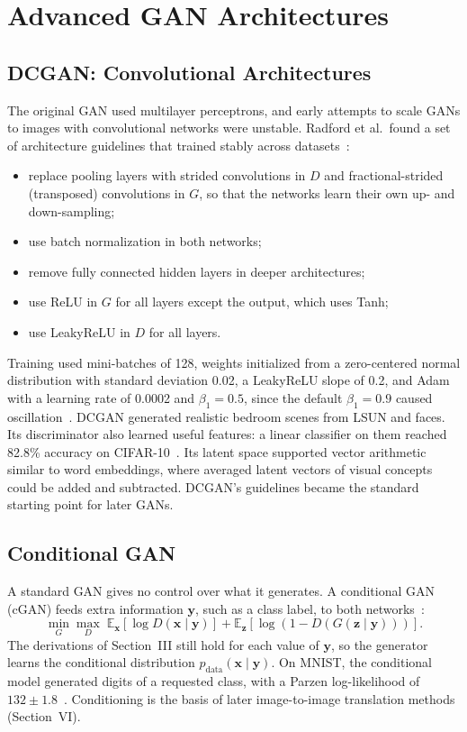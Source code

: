 \documentclass[conference]{IEEEtran}
\newcommand{\E}{\mathbb{E}}
\newcommand{\pdata}{p_{\mathrm{data}}}
\begin{document}
\section{Advanced GAN Architectures}
\subsection{DCGAN: Convolutional Architectures}
The original GAN used multilayer perceptrons, and early attempts to scale GANs to images with convolutional networks were unstable. Radford et al.\ found a set of architecture guidelines that trained stably across datasets~\cite{radford2016}:
\begin{itemize}
\item replace pooling layers with strided convolutions in $D$ and fractional-strided (transposed) convolutions in $G$, so that the networks learn their own up- and down-sampling;
\item use batch normalization in both networks;
\item remove fully connected hidden layers in deeper architectures;
\item use ReLU in $G$ for all layers except the output, which uses Tanh;
\item use LeakyReLU in $D$ for all layers.
\end{itemize}
Training used mini-batches of 128, weights initialized from a zero-centered normal distribution with standard deviation 0.02, a LeakyReLU slope of 0.2, and Adam with a learning rate of 0.0002 and $\beta_1=0.5$, since the default $\beta_1=0.9$ caused oscillation~\cite{radford2016}. DCGAN generated realistic bedroom scenes from LSUN and faces. Its discriminator also learned useful features: a linear classifier on them reached 82.8\% accuracy on CIFAR-10~\cite{radford2016}. Its latent space supported vector arithmetic similar to word embeddings, where averaged latent vectors of visual concepts could be added and subtracted. DCGAN's guidelines became the standard starting point for later GANs.

\subsection{Conditional GAN}
A standard GAN gives no control over what it generates. A conditional GAN (cGAN) feeds extra information $\mathbf{y}$, such as a class label, to both networks~\cite{mirza2014}:
\begin{equation}
\min_G\max_D\;\E_{\mathbf{x}}\!\left[\log D(\mathbf{x}\mid\mathbf{y})\right]+\E_{\mathbf{z}}\!\left[\log\left(1-D(G(\mathbf{z}\mid\mathbf{y}))\right)\right].
\end{equation}
The derivations of Section~III still hold for each value of $\mathbf{y}$, so the generator learns the conditional distribution $\pdata(\mathbf{x}\mid\mathbf{y})$. On MNIST, the conditional model generated digits of a requested class, with a Parzen log-likelihood of $132\pm1.8$~\cite{mirza2014}. Conditioning is the basis of later image-to-image translation methods (Section~VI).
\end{document}
